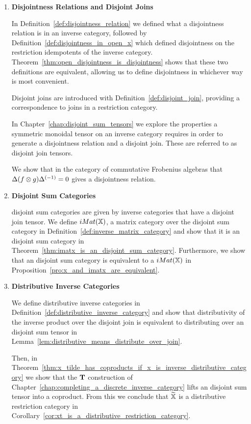 \begin{enumerate}
\item \textbf{Disjointness Relations and Disjoint Joins}

In Definition~\ref{def:disjointness_relation} we defined what a disjointness relation is in an
inverse category, followed by Definition~\ref{def:disjointness_in_open_x} which defined disjointness
on the restriction idempotents of the inverse
category. Theorem~\ref{thm:open_disjointness_is_disjointness} shows that these two definitions are
equivalent, allowing us to define disjointness in whichever way is most convenient.

Disjoint joins are introduced with Definition~\ref{def:disjoint_join}, providing a correspondence to
joins in a restriction category.

In Chapter~\ref{chap:disjoint_sum_tensors} we explore the properties a symmetric monoidal tensor
on an inverse category requires in order to generate a disjointness relation and a disjoint
join. These are referred to as disjoint join tensors.

We show that in the category of commutative Frobenius algebras that $\Delta(f\otimes g){\Delta}^{(-1)} = 0$
gives a disjointness relation.

\item \textbf{Disjoint Sum Categories}

disjoint sum categories are given by inverse categories that have a disjoint join tensor. We define
$iMat({\mathbb{X}})$, a matrix category over the disjoint sum category \X in
Definition~\ref{def:inverse_matrix_category} and show that it is an disjoint sum category in
Theorem~\ref{thm:imatx_is_an_disjoint_sum_category}. Furthermore, we show
that an disjoint sum category \X is equivalent to a $iMat({\mathbb{X}})$ in
Proposition~\ref{pro:x_and_imatx_are_equivalent}.


\item \textbf{Distributive Inverse Categories}

We define distributive inverse categories in Definition~\ref{def:distributive_inverse_category} and
show that distributivity of the inverse product over the disjoint join is equivalent to distributing
over an disjoint sum tensor in Lemma~\ref{lem:distributive_means_distribute_over_join}.

Then, in Theorem~\ref{thm:x_tilde_has_coproducts_if_x_is_inverse_distributive_category} we show that
the $\mathbf{T}$ construction of Chapter~\ref{chap:completing_a_discrete_inverse_category} lifts an disjoint sum
tensor into a coproduct. From this we conclude that $\widetilde{\mathbb{X}}$ is a distributive restriction category in
Corollary~\ref{cor:xt_is_a_distributive_restriction_category}.


\end{enumerate}
